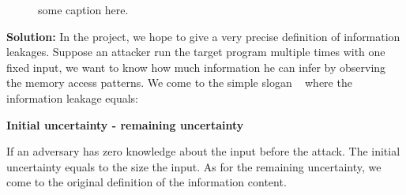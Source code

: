\begin{figure}
\centering
{}
\caption{some caption here. }
\end{figure}

\textbf{Solution:}
In the project, we hope to give a very precise definition of information leakages. 
Suppose an attacker run the target program multiple times with one fixed input, we
want to know how much information he can infer by observing the memory access patterns.
We come to the simple slogan ~\cite{10.1007/978-3-642-00596-1_21} where the information
leakage equals:

\textbf{Initial uncertainty - remaining uncertainty}

If an adversary has zero knowledge about the input before the attack. The initial uncertainty
equals to the size the input. As for the remaining uncertainty, we come to the original definition
of the information content.

